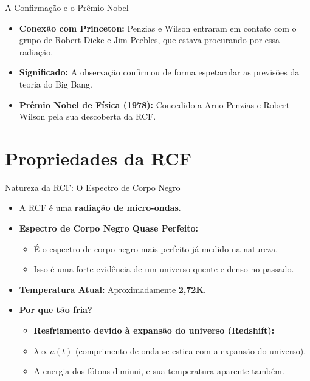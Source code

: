 \documentclass{beamer}
\begin{document}
\begin{frame}{A Confirmação e o Prêmio Nobel}
    \begin{itemize}
        \item \textbf{Conexão com Princeton:} Penzias e Wilson entraram em contato com o grupo de Robert Dicke e Jim Peebles, que estava procurando por essa radiação.
        \item \textbf{Significado:} A observação confirmou de forma espetacular as previsões da teoria do Big Bang.
        \item \textbf{Prêmio Nobel de Física (1978):} Concedido a Arno Penzias e Robert Wilson pela sua descoberta da RCF.
    \end{itemize}
\end{frame}

\section{Propriedades da RCF}

\begin{frame}{Natureza da RCF: O Espectro de Corpo Negro}
    \begin{itemize}
        \item A RCF é uma \textbf{radiação de micro-ondas}.
        \item \textbf{Espectro de Corpo Negro Quase Perfeito:}
        \begin{itemize}
            \item É o espectro de corpo negro mais perfeito já medido na natureza.
            \item Isso é uma forte evidência de um universo quente e denso no passado.
        \end{itemize}
        \item \textbf{Temperatura Atual:} Aproximadamente \textbf{2,72K}.
        \item \textbf{Por que tão fria?}
        \begin{itemize}
            \item \textbf{Resfriamento devido à expansão do universo (Redshift):}
            \item $\lambda \propto a(t)$ (comprimento de onda se estica com a expansão do universo).
            \item A energia dos fótons diminui, e sua temperatura aparente também.
        \end{itemize}
    \end{itemize}
\end{frame}
\end{document}
